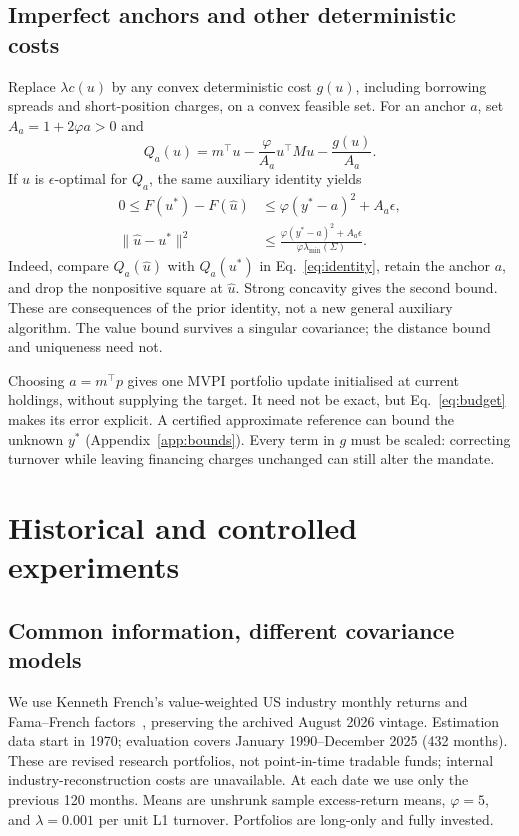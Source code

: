 \documentclass[sigconf,anonymous,review]{acmart}
\begin{document}
\subsection{Imperfect anchors and other deterministic costs}
Replace $\lambda c(u)$ by any convex deterministic cost $g(u)$, including borrowing spreads and short-position charges, on a convex feasible set. For an anchor $a$, set $A_a=1+2\varphi a>0$ and
\[
Q_a(u)=m^\top u-\frac{\varphi}{A_a}u^\top Mu-\frac{g(u)}{A_a}.
\]
If $\widehat u$ is $\epsilon$-optimal for $Q_a$, the same auxiliary identity yields
\begin{align}\label{eq:budget}
0\le F(u^*)-F(\widehat u)
&\le\varphi(y^*-a)^2+A_a\epsilon,\\
\|\widehat u-u^*\|^2
&\le\frac{\varphi(y^*-a)^2+A_a\epsilon}
{\varphi\lambda_{\min}(\Sigma)}.\nonumber
\end{align}
Indeed, compare $Q_a(\widehat u)$ with $Q_a(u^*)$ in Eq.\ \eqref{eq:identity}, retain the anchor $a$, and drop the nonpositive square at $\widehat u$. Strong concavity gives the second bound. These are consequences of the prior identity, not a new general auxiliary algorithm. The value bound survives a singular covariance; the distance bound and uniqueness need not.

Choosing $a=m^\top p$ gives one MVPI portfolio update initialised at current holdings, without supplying the target. It need not be exact, but Eq.\ \eqref{eq:budget} makes its error explicit. A certified approximate reference can bound the unknown $y^*$ (Appendix~\ref{app:bounds}). Every term in $g$ must be scaled: correcting turnover while leaving financing charges unchanged can still alter the mandate.


\section{Historical and controlled experiments}
\subsection{Common information, different covariance models}
We use Kenneth French's value-weighted US industry monthly returns and Fama--French factors~\cite{french}, preserving the archived August 2026 vintage. Estimation data start in 1970; evaluation covers January 1990--December 2025 (432 months). These are revised research portfolios, not point-in-time tradable funds; internal industry-reconstruction costs are unavailable. At each date we use only the previous 120 months. Means are unshrunk sample excess-return means, $\varphi=5$, and $\lambda=0.001$ per unit L1 turnover. Portfolios are long-only and fully invested.
\end{document}
